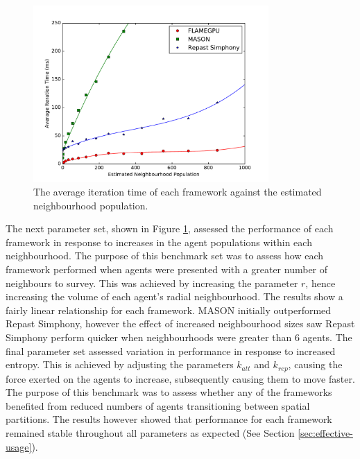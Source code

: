   \begin{figure}[tb]
\begin{center}
    \includegraphics[width=0.8\textwidth]{../resources/neighbourscale_graph/graph.pdf}
    \caption{\label{fig:graph-neighbourhood-pop}The average iteration time of each framework against the estimated neighbourhood population.}
\end{center}
\vspace{-1cm}
\end{figure}
  
  The next parameter set, shown in Figure \ref{fig:graph-neighbourhood-pop}, assessed the performance of each framework in response to increases in the agent populations within each neighbourhood. The purpose of this benchmark set was to assess how each framework performed when agents were presented with a greater number of neighbours to survey. This was achieved by increasing the parameter $r$, hence increasing the volume of each agent's radial neighbourhood. The results show a fairly linear relationship for each framework. MASON initially outperformed Repast Simphony, however the effect of increased neighbourhood sizes saw Repast Simphony perform quicker when neighbourhoods were greater than 6 agents.
  The final parameter set assessed variation in performance in response to increased entropy. This is achieved by adjusting the parameters $k_{att}$ and $k_{rep}$, causing the force exerted on the agents to increase, subsequently causing them to move faster.
  The purpose of this benchmark was to assess whether any of the frameworks benefited from reduced numbers of agents transitioning between spatial partitions. The results however showed that performance for each framework remained stable throughout all parameters as expected (See Section \ref{sec:effective-usage}).
